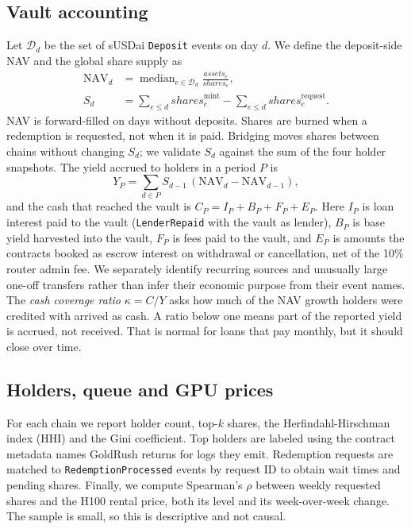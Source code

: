 \subsection{Vault accounting}
Let $\mathcal{D}_d$ be the set of sUSDai \texttt{Deposit} events on day $d$. We define the deposit-side NAV and the global share supply as
\begin{align}
\mathrm{NAV}_d &= \operatorname{median}_{e\in\mathcal{D}_d}\frac{\mathit{assets}_e}{\mathit{shares}_e},\\
S_d &= \sum_{e\le d}\mathit{shares}^{\text{mint}}_e-\sum_{e\le d}\mathit{shares}^{\text{request}}_e .
\end{align}
NAV is forward-filled on days without deposits. Shares are burned when a redemption is requested, not when it is paid. Bridging moves shares between chains without changing $S_d$; we validate $S_d$ against the sum of the four holder snapshots. The yield accrued to holders in a period $P$ is
\begin{equation}
Y_P=\sum_{d\in P} S_{d-1}\,(\mathrm{NAV}_d-\mathrm{NAV}_{d-1}),
\end{equation}
and the cash that reached the vault is $C_P=I_P+B_P+F_P+E_P$. Here $I_P$ is loan interest paid to the vault (\texttt{LenderRepaid} with the vault as lender), $B_P$ is base yield harvested into the vault, $F_P$ is fees paid to the vault, and $E_P$ is amounts the contracts booked as escrow interest on withdrawal or cancellation, net of the 10\% router admin fee. We separately identify recurring sources and unusually large one-off transfers rather than infer their economic purpose from their event names. The \emph{cash coverage ratio} $\kappa=C/Y$ asks how much of the NAV growth holders were credited with arrived as cash. A ratio below one means part of the reported yield is accrued, not received. That is normal for loans that pay monthly, but it should close over time.

\subsection{Holders, queue and GPU prices}
For each chain we report holder count, top-$k$ shares, the Herfindahl-Hirschman index (HHI) and the Gini coefficient. Top holders are labeled using the contract metadata names GoldRush returns for logs they emit. Redemption requests are matched to \texttt{RedemptionProcessed} events by request ID to obtain wait times and pending shares. Finally, we compute Spearman's $\rho$ between weekly requested shares and the H100 rental price, both its level and its week-over-week change. The sample is small, so this is descriptive and not causal.

